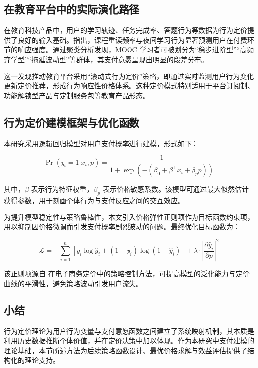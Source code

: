 \subsection{在教育平台中的实际演化路径}

在教育科技产品中，用户的学习轨迹、任务完成率、答题行为等数据为行为定价提供了良好的输入基础。\cite{zhang2021educationalproduct}指出，课程重读频率与夜间学习行为显著预测用户在付费环节的响应强度。\cite{sun2021moocpricing}通过聚类分析发现，MOOC 学习者可被划分为“稳步进阶型”“高频弃学型”“拖延波动型”等群体，其支付意愿呈现出明显的段差分布。

这一发现推动教育平台采用“滚动式行为定价”策略，即通过实时监测用户行为变化更新定价推荐，形成行为响应性价格体系。这种定价模式特别适用于平台订阅制、功能解锁型产品与定制服务包等教育产品形态。

\subsection{行为定价建模框架与优化函数}

本研究采用逻辑回归模型对用户支付概率进行建模，形式如下：

\begin{equation}
\Pr(y_i = 1 | x_i, p) = \frac{1}{1 + \exp(-(\beta_0 + \beta^\top x_i + \beta_p p))}
\end{equation}

其中，$\beta$ 表示行为特征权重，$\beta_p$ 表示价格敏感系数。该模型可通过最大似然估计获得参数，用于刻画个体行为与支付反应之间的交互效应。

为提升模型稳定性与策略鲁棒性，本文引入价格弹性正则项作为目标函数约束项，用以抑制因价格微调而引发支付概率剧烈波动的问题。最终优化目标函数为：

\begin{equation}
\mathcal{L} = -\sum_{i=1}^{n} \left[ y_i \log \hat{y}_i + (1 - y_i)\log(1 - \hat{y}_i) \right] + \lambda \cdot \left| \frac{\partial \hat{y}_i}{\partial p} \right|^2
\end{equation}

该正则项源自 \cite{choi2021priceacceptance}在电子商务定价中的策略控制方法，可提高模型的泛化能力与定价曲线的平滑性，避免策略波动引发用户流失。

\subsection*{小结}

行为定价理论为用户行为变量与支付意愿函数之间建立了系统映射机制，其本质是利用历史数据推断个体价值，并在定价决策中加以体现。作为本研究中支付建模的理论基础，本节所述方法为后续策略函数设计、最优价格求解与效益评估提供了结构化的理论支持。


